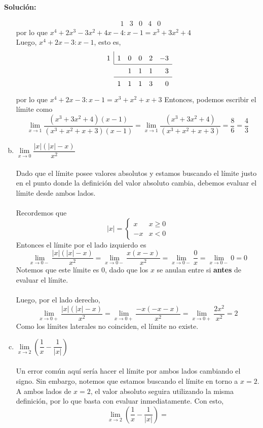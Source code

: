 \documentclass[12pt]{article}
\newenvironment{solucion}
{\begin{mdframed}[backgroundcolor=black!10]
		{\bf Solución:}\\
	}
	{
	\end{mdframed}
}
\newenvironment{preguntas}
{\begin{enumerate}\itemsep12pt
	}
	{
	\end{enumerate}
}
\newcommand{\ra}{\rightarrow}
\begin{document}
\begin{preguntas}
\begin{solucion}
\begin{enumerate}[a)]
\[\begin{array}{rrrrrr}
& 1 & 3& 0 & 4 & 0
\end{array}
\]
por lo que $x^4+2x^3-3x^2+4x-4 : x-1 = x^3+3x^2+4$\\
Luego, $x^4+2x-3 : x-1$, esto es,
\[
\renewcommand\arraystretch{1.5}
\setlength\doublerulesep{0pt}
\begin{array}{rrrrrr}
\multicolumn{1}{r|}{1} & 1 & 0 & 0 & 2 & -3\\\cline{2-6}
& & 1& 1 & 1 & 3\\\cline{2-6}
& 1 & 1& 1 & 3 & 0
\end{array}
\]
por lo que $x^4+2x-3 : x-1 = x^3+x^2+x+3$
Entonces, podemos escribir el límite como
$$\lim\limits_{x \ra 1} \dfrac{(x^3+3x^2+4)(x-1)}{(x^3+x^2+x+3)(x-1)}
= \lim\limits_{x \ra 1} \dfrac{(x^3+3x^2+4)}{(x^3+x^2+x+3)}
= \dfrac{8}{6} = \dfrac{4}{3}$$
\item $\lim\limits_{x \ra 0} \dfrac{|x|(|x|-x)}{x^2}$\\
\\
Dado que el límite posee valores absolutos y estamos buscando el límite justo en el punto donde la definición del valor absoluto cambia, debemos evaluar el límite desde ambos lados.\\\\
Recordemos que
$$|x| = \begin{cases}
x & x \geq 0 \\
-x & x < 0
\end{cases}
$$
Entonces el límite por el lado izquierdo es
$$\lim\limits_{x \ra 0-} \dfrac{|x|(|x|-x)}{x^2} =
\lim\limits_{x \ra 0-} \dfrac{x(x-x)}{x^2} =
\lim\limits_{x \ra 0-} \dfrac{0}{x} =
\lim\limits_{x \ra 0-} 0 =
0$$
Notemos que este límite es 0, dado que los $x$ se anulan entre si \textbf{antes} de evaluar el límite.\\\\
Luego, por el lado derecho,
$$\lim\limits_{x \ra 0+} \dfrac{|x|(|x|-x)}{x^2} =
\lim\limits_{x \ra 0+} \dfrac{-x(-x-x)}{x^2} =
\lim\limits_{x \ra 0+} \dfrac{2x^2}{x^2} =
2 $$
Como los límites laterales no coinciden, el límite no existe.
\item $\lim\limits_{x \ra 2}\left(\dfrac{1}{x}-\dfrac{1}{|x|}\right)$\\
\\
Un error común aquí sería hacer el límite por ambos lados cambiando el signo. Sin embargo, notemos que estamos buscando el límite en torno a $x=2$. A ambos lados de $x=2$, el valor absoluto seguira utilizando la misma definición, por lo que basta con evaluar inmediatamente. Con esto,
$$\lim\limits_{x \ra 2}\left(\dfrac{1}{x}-\dfrac{1}{|x|}\right) = 
$$
\end{enumerate}
\end{solucion}
\end{preguntas}
\end{document}
